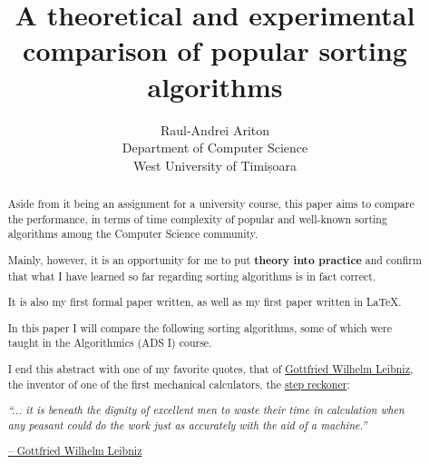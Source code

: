 \documentclass[a4paper]{article}
\begin{document}
    \title{A \textbf{theoretical} and \textbf{experimental} comparison of popular sorting algorithms}
    \author{Raul-Andrei Ariton \\ Department of Computer Science \\ West University of Timișoara \\}
    \maketitle

    \begin{abstract}
        
        Aside from it being an assignment for a university course, 
        this paper aims to compare the performance, in terms of time complexity
        of popular and well-known sorting algorithms among the Computer Science community.

        Mainly, however, it is an opportunity for me to put \textbf{theory into practice}
        and confirm that what I have learned so far regarding sorting algorithms is in fact correct.

        It is also my first formal paper written, as well as my first paper written in \LaTeX.

        In this paper I will compare the following sorting algorithms, 
        some of which were taught in the Algorithmics (ADS I) course.

        I end this abstract with one of my favorite quotes, that of 
        \href{https://en.wikipedia.org/wiki/Gottfried_Wilhelm_Leibniz}{Gottfried Wilhelm Leibniz}, 
        the inventor of one of the first mechanical calculators, the 
        \href{https://en.wikipedia.org/wiki/Stepped_reckoner}{step reckoner}:

        \epigraph{\textit{
        ``... it is beneath
        the dignity of excellent men
        to waste their time in calculation 
        when any peasant
        could do the work just as accurately with the aid 
        of a machine.''}}{\href{https://en.wikipedia.org/wiki/Gottfried_Wilhelm_Leibniz}{-- Gottfried Wilhelm Leibniz}}
        
    \end{abstract} 

    \newpage

    \tableofcontents

    \newpage
        
    
    
\end{document}

